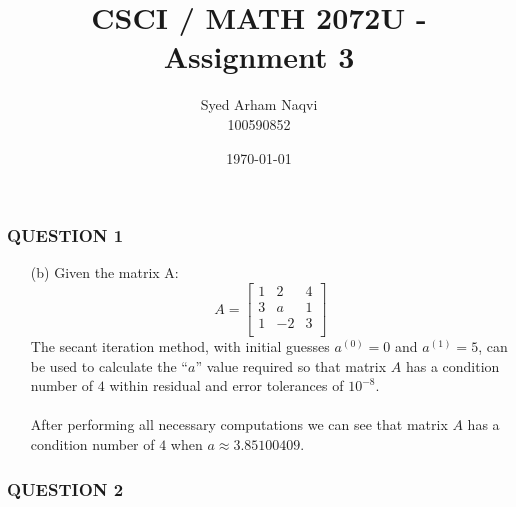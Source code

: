\documentclass{article}
\title{CSCI / MATH 2072U - Assignment 3}
\author{Syed Arham Naqvi \\ \small{100590852}}
\date{\today}
\begin{document}
\maketitle


\subsubsection*{QUESTION 1}

\vspace{10pt}

\begin{enumerate}

    \item[(b)]  Given the matrix A:
                \begin{equation*}
                    A =
                    \begin{bmatrix}
                        1 & 2 & 4 \\
                        3 & a & 1 \\
                        1 & -2 & 3 \\
                    \end{bmatrix} 
                \end{equation*}
                The secant iteration method, with initial guesses $a^{(0)}=0$ and $a^{(1)}=5$, can be used to calculate the ``$a$''
                value required so that matrix $A$ has a condition number of $4$ within residual and error tolerances of $10^{-8}$.
                \\\\
                After performing all necessary computations we can see that matrix $A$ has a condition number of $4$ when
                $a \approx 3.85100409$.
    
    \vspace{10pt}

\end{enumerate}


\subsubsection*{QUESTION 2}

\vspace{10pt}
\end{document}
